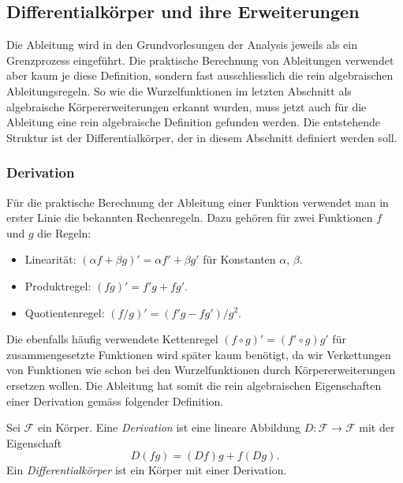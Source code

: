 %
%
%
\subsection{Differentialkörper und ihre Erweiterungen
\label{buch:integral:subsection:diffke}}
Die Ableitung wird in den Grundvorlesungen der Analysis jeweils
als ein Grenzprozess eingeführt.
Die praktische Berechnung von Ableitungen verwendet aber kaum je
diese Definition, sondern fast ausschliesslich die rein algebraischen
Ableitungsregeln.
So wie die Wurzelfunktionen im letzten Abschnitt als algebraische
Körpererweiterungen erkannt wurden, muss jetzt auch für die Ableitung
eine rein algebraische Definition gefunden werden.
Die entstehende Struktur ist der Differentialkörper, der in diesem
Abschnitt definiert werden soll.

%
%
\subsubsection{Derivation}
Für die praktische Berechnung der Ableitung einer Funktion verwendet
man in erster Linie die bekannten Rechenregeln.
Dazu gehören für zwei Funktionen $f$ und $g$ die Regeln:
\begin{itemize}
\item Linearität: $(\alpha f+\beta g)' = \alpha f' + \beta g'$ für
Konstanten $\alpha$, $\beta$.
\item Produktregel: $(fg)'=f'g+fg'$.
%
\item Quotientenregel: $(f/g)' = (f'g-fg')/g^2$.
%
\end{itemize}
Die ebenfalls häufig verwendete Kettenregel $(f\circ g)' = (f'\circ g) g'$
%
für zusammengesetzte Funktionen wird später kaum benötigt, da wir
Verkettungen von Funktionen wie schon bei den Wurzelfunktionen
durch Körpererweiterungen ersetzen wollen.
Die Ableitung hat somit die rein algebraischen Eigenschaften
einer Derivation gemäss folgender Definition.

\begin{definition}
Sei $\mathscr{F}$ ein Körper.
Eine {\em Derivation} ist eine lineare Abbildung
%
$D\colon \mathscr{F}\to\mathscr{F}$
mit der Eigenschaft
\[
D(fg) = (Df)g+f(Dg).
\]
Ein {\em Differentialkörper} ist ein Körper mit einer Derivation.
%
\end{definition}

